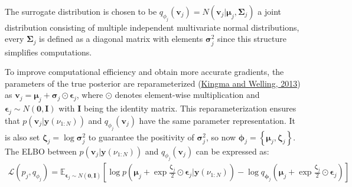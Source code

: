 \documentclass[12pt,a4paper]{article}
\begin{document}
The surrogate distribution is chosen to be $q_{\phi_j}(\mathbf{v}_j) = N(\mathbf{v}_j|\bm{\mu}_j,\bm{\Sigma}_j)$ a joint distribution consisting of multiple independent multivariate normal distributions, every $\bm{\Sigma}_j$ is defined as a diagonal matrix with elements $\bm{\sigma}_j^2$ since this structure simplifies computations.

To improve computational efficiency and obtain more accurate gradients, the parameters of the true posterior are reparameterized (\hyperref[kingma2013]{Kingma and Welling, 2013}) as  $\mathbf{v}_j = \bm{\mu}_j+ \bm{\sigma}_j \odot \bm{\epsilon}_j$, where $\odot$ denotes element-wise multiplication and $\bm{\epsilon}_j \sim N(\bm{0}, \mathbf{I})$ with $\mathbf{I}$ being the identity matrix. This reparameterization ensures that $p(\mathbf{v}_j|\mathbf{y}(\nu_{1:N}))$ and $q_{\phi_j}(\mathbf{v}_j)$ have the same parameter representation.  It is also set $\bm{\zeta}_j = \log \bm{\sigma}_j^2$ to guarantee the positivity of $\bm{\sigma}_j^2$, so now $\bm{\phi}_j = \left\{\bm{\mu}_j, \bm{\zeta}_j \right\}$. The ELBO between $p(\mathbf{v}_j|\mathbf{y}(\nu_{1:N}))$ and $q_{\phi_j}(\mathbf{v}_j)$ can be expressed as:
\begin{align}
\mathcal{L}(p_j,q_{\phi_j}) = \mathbb{E}_{\bm{\epsilon}_j \sim N(\bm{0}, \mathbf{I})}
\left[\log p(\bm{\mu}_j + \exp{\frac{\bm{\zeta}_j}{2}} \odot \bm{\epsilon}_j| \mathbf{y}(\nu_{1:N}))-
\log q_{\bm{\phi}_j}(\bm{\mu}_j + \exp{{\frac{\bm{\zeta}_j}{2}}\odot \bm{\epsilon}_j}) \right]
\label{elbo}
\end{align}
\end{document}
